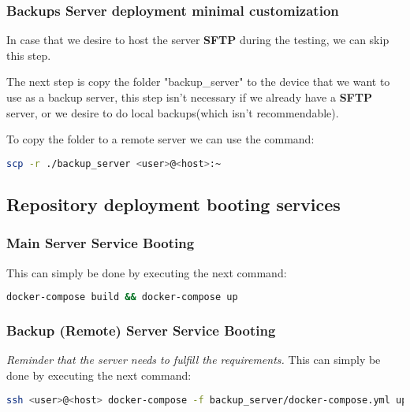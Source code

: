 \newpage
\subsubsection[Backups Server deployment minimal customization]{Backups Server deployment minimal customization}
\begin{flushleft}
    In case that we desire to host the server \textbf{SFTP} during the testing, we can skip this step.
\end{flushleft}

\begin{flushleft}
    The next step is copy the folder "backup\_server" to the device that we want to use as a backup server, this step
    isn't necessary if we already have a \textbf{SFTP} server, or we desire to do local backups(which isn't recommendable).

    To copy the folder to a remote server we can use the command:
\begin{lstlisting}[language=bash,label={lst:scp}]
scp -r ./backup_server <user>@<host>:~
\end{lstlisting}
\end{flushleft}

\subsection{Repository deployment booting services}\label{subsec:repository-deployment-booting-services}
\subsubsection[Main Server Service Booting]{Main Server Service Booting}
This can simply be done by executing the next command:
\begin{lstlisting}[language=bash,label={lst:compose-up}]
docker-compose build && docker-compose up
\end{lstlisting}

\subsubsection[Backup (Remote) Server Service Booting]{Backup (Remote) Server Service Booting}
\textit{Reminder that the server needs to fulfill the requirements.}
This can simply be done by executing the next command:
\begin{lstlisting}[language=bash,label={lst:compose-up-bk-remote}]
ssh <user>@<host> docker-compose -f backup_server/docker-compose.yml up -d
\end{lstlisting}

